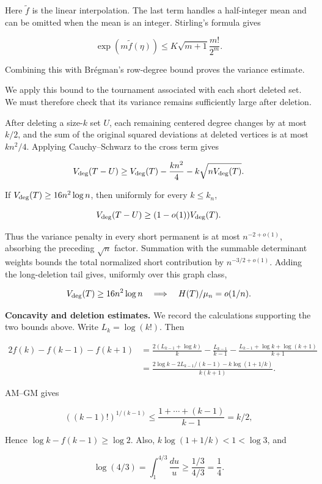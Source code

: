 \documentclass[11pt,a4paper]{article}
\begin{document}
Here \(\widetilde f\) is the linear interpolation. The last term handles a half-integer mean and can be omitted when the mean is an integer. Stirling's formula gives

\[
\exp(m\widetilde f(\eta))\le K\sqrt{m+1}\frac{m!}{2^m}.
\]

Combining this with Brégman's row-degree bound proves the variance estimate.

We apply this bound to the tournament associated with each short deleted set. We must therefore check that its variance remains sufficiently large after deletion.

After deleting a size-\(k\) set \(U\), each remaining centered degree changes by at most \(k/2\), and the sum of the original squared deviations at deleted vertices is at most \(kn^2/4\). Applying Cauchy--Schwarz to the cross term gives

\[
V_{\rm deg}(T-U)\ge V_{\rm deg}(T)-\frac{kn^2}{4}-k\sqrt{nV_{\rm deg}(T)}.
\]

If \(V_{\rm deg}(T)\ge16n^2\log n\), then uniformly for every \(k\le k_n\),

\[
V_{\rm deg}(T-U)\ge(1-o(1))V_{\rm deg}(T).
\]

Thus the variance penalty in every short permanent is at most \(n^{-2+o(1)}\), absorbing the preceding \(\sqrt n\) factor. Summation with the summable determinant weights bounds the total normalized short contribution by \(n^{-3/2+o(1)}\). Adding the long-deletion tail gives, uniformly over this graph class,

\[
V_{\rm deg}(T)\ge16n^2\log n\quad\Longrightarrow\quad
H(T)/\mu_n=o(1/n).
\]

\textbf{Concavity and deletion estimates.} We record the calculations supporting the two bounds above. Write \(L_k=\log(k!)\). Then

\[
\begin{aligned}
2f(k)-f(k-1)-f(k+1)
&=\frac{2(L_{k-1}+\log k)}k-\frac{L_{k-1}}{k-1}
-\frac{L_{k-1}+\log k+\log(k+1)}{k+1}\\
&=\frac{2\log k-2L_{k-1}/(k-1)-k\log(1+1/k)}{k(k+1)}.
\end{aligned}
\]

AM--GM gives

\[
((k-1)!)^{1/(k-1)}\le\frac{1+\cdots+(k-1)}{k-1}=k/2,
\]

Hence \(\log k-f(k-1)\ge\log2\). Also, \(k\log(1+1/k)<1<\log3\), and

\[
\log(4/3)=\int_1^{4/3}\frac{du}{u}\ge\frac{1/3}{4/3}=\frac14.
\]
\end{document}
